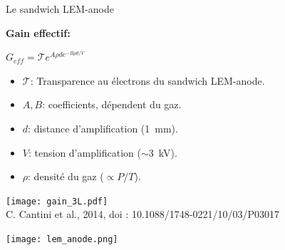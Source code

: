     \begin{frame}{Le sandwich LEM-anode}
	   		\begin{minipage}{0.48\textwidth}
	   			\begin{scriptsize}
		   			\textbf{Gain effectif:}\\
		   		\end{scriptsize}
	   			$G_{eff} = \mathcal{T}e^{A\rho d e^{-B\rho d/V}}$\\
	   			\begin{scriptsize}
	    			\begin{itemize}
	    				\item $\mathcal{T}$: Transparence au électrons du sandwich LEM-anode.
	    				\item $A,B$: coefficients, dépendent du gaz.
	    				\item $d$: distance d'amplification (\SI{1}{\milli\meter}).
	    				\item $V$: tension d'amplification ($\sim$\SI{3}{\kilo\volt}).
	    				\item $\rho$: densité du gaz ($\propto P/T$).
	    			\end{itemize}
	    		\end{scriptsize} 
	   			\vfill
                \centering
				\texttt{[image: gain\_3L.pdf]}\\\tiny{C. Cantini et al., 2014, doi : 10.1088/1748-0221/10/03/P03017}
	   		\end{minipage}\hfill
	   		\begin{minipage}{0.48\textwidth}
	   			\texttt{[image: lem\_anode.png]}
	   		\end{minipage}
    \end{frame}


